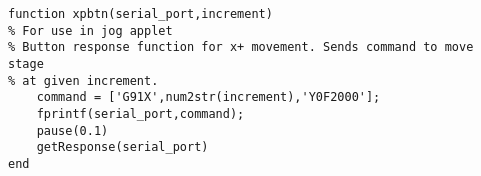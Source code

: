 \begin{lstlisting}
function xpbtn(serial_port,increment)
% For use in jog applet
% Button response function for x+ movement. Sends command to move stage
% at given increment.
    command = ['G91X',num2str(increment),'Y0F2000'];
    fprintf(serial_port,command);
    pause(0.1)
    getResponse(serial_port)
end

\end{lstlisting}